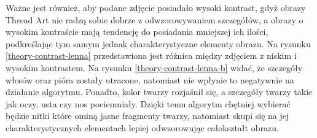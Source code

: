         Ważne jest również, aby podane zdjęcie posiadało wysoki kontrast, gdyż obrazy Thread Art nie radzą sobie dobrze z odwzorowywaniem szczegółów, a obrazy o wysokim kontraście mają tendencję do posiadania mniejszej ich ilości, podkreślając tym samym jednak charakterystyczne elementy obrazu. Na rysunku \ref{theory-contrast-lenna} przedstawiona jest różnica między zdjęciem z niskim i wysokim kontrastem. Na rysunku \ref{theory-contrast-lenna-b} widać, że szczegóły włosów oraz pióra zostały utracone, natomiast nie wpłynie to negatywnie na działanie algorytmu. Ponadto, kolor twarzy rozjaśnił się, a szczegóły twarzy takie jak oczy, usta czy nos pociemniały. Dzięki temu algorytm chętniej wybierać będzie nitki które ominą jasne fragmenty twarzy, natomiast skupi się na jej charakterystycznych elementach lepiej odwzorowując całokształt obrazu.
        
